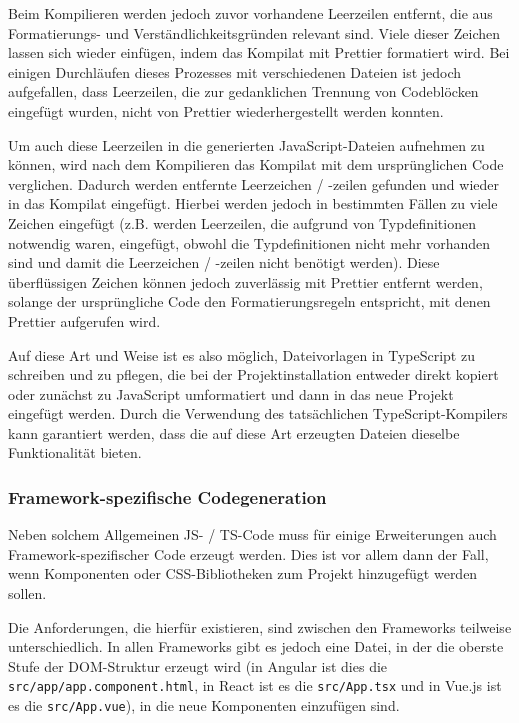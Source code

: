 Beim Kompilieren werden jedoch zuvor vorhandene Leerzeilen entfernt, die aus Formatierungs- und Verständlichkeitsgründen relevant sind. Viele dieser Zeichen lassen sich wieder einfügen, indem das Kompilat mit Prettier formatiert wird. Bei einigen Durchläufen dieses Prozesses mit verschiedenen Dateien ist jedoch aufgefallen, dass Leerzeilen, die zur gedanklichen Trennung von Codeblöcken eingefügt wurden, nicht von Prettier wiederhergestellt werden konnten.

Um auch diese Leerzeilen in die generierten JavaScript-Dateien aufnehmen zu können, wird nach dem Kompilieren das Kompilat mit dem ursprünglichen Code verglichen. Dadurch werden entfernte Leerzeichen / -zeilen gefunden und wieder in das Kompilat eingefügt. Hierbei werden jedoch in bestimmten Fällen zu viele Zeichen eingefügt (z.B. werden Leerzeilen, die aufgrund von Typdefinitionen notwendig waren, eingefügt, obwohl die Typdefinitionen nicht mehr vorhanden sind und damit die Leerzeichen / -zeilen nicht benötigt werden). Diese überflüssigen Zeichen können jedoch zuverlässig mit Prettier entfernt werden, solange der ursprüngliche Code den Formatierungsregeln entspricht, mit denen Prettier aufgerufen wird.

Auf diese Art und Weise ist es also möglich, Dateivorlagen in TypeScript zu schreiben und zu pflegen, die bei der Projektinstallation entweder direkt kopiert oder zunächst zu JavaScript umformatiert und dann in das neue Projekt eingefügt werden. Durch die Verwendung des tatsächlichen TypeScript-Kompilers kann garantiert werden, dass die auf diese Art erzeugten Dateien dieselbe Funktionalität bieten.

\subsubsection{Framework-spezifische Codegeneration}
Neben solchem Allgemeinen \gls{JS}- / \gls{TS}-Code muss für einige Erweiterungen auch Framework-spezifischer Code erzeugt werden. Dies ist vor allem dann der Fall, wenn Komponenten oder CSS-Bibliotheken zum Projekt hinzugefügt werden sollen.

Die Anforderungen, die hierfür existieren, sind zwischen den Frameworks teilweise unterschiedlich. In allen Frameworks gibt es jedoch eine Datei, in der die oberste Stufe der \gls{DOM}-Struktur erzeugt wird (in Angular ist dies die \verb|src/app/app.component.html|, in React ist es die \verb|src/App.tsx| und in Vue.js ist es die \verb|src/App.vue|), in die neue Komponenten einzufügen sind.

